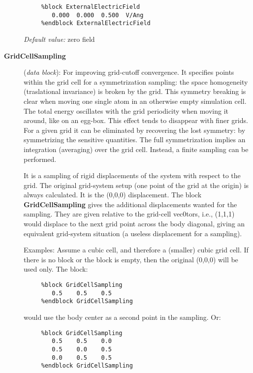 \begin{description}
\begin{verbatim}
     %block ExternalElectricField
        0.000  0.000  0.500  V/Ang
     %endblock ExternalElectricField
\end{verbatim}

{\it Default value:} zero field


\item[{\bf GridCellSampling}] ({\it data block}): 
For improving grid-cutoff convergence. It specifies points within
the grid cell for a symmetrization sampling: the space 
homogeneity (traslational invariance)
is broken by the grid. This symmetry breaking is clear
when moving one single atom in an otherwise empty simulation cell.
The total energy oscillates with the grid periodicity when moving
it around, like on an egg-box. This effect tends to disappear with 
finer grids. For a given grid it can be eliminated
by recovering the lost symmetry: by symmetrizing the sensitive
quantities. The full symmetrization implies an integration (averaging)
over the grid cell. Instead, a finite sampling can be performed.

It is a sampling of rigid displacements of the system with respect
to the grid. The original grid-system setup (one point of the grid
at the origin) is always calculated. It is the (0,0,0) displacement. 
The block {\bf GridCellSampling} gives the additional displacements
wanted for the sampling. They are given relative to the grid-cell 
vec0tors, i.e., (1,1,1) would displace to the next grid point across
the body diagonal, giving an equivalent grid-system situation
(a useless displacement for a sampling).

Examples: Assume a cubic cell, and therefore a (smaller) cubic grid cell.
If there is no block or the block is empty, then the original (0,0,0)
will be used only. The block: 

\begin{verbatim}
     %block GridCellSampling
        0.5    0.5    0.5
     %endblock GridCellSampling
\end{verbatim}

would use the body center as a second point in the sampling. Or:


\begin{verbatim}
     %block GridCellSampling
        0.5    0.5    0.0
        0.5    0.0    0.5
        0.0    0.5    0.5
     %endblock GridCellSampling
\end{verbatim}


\end{description}
